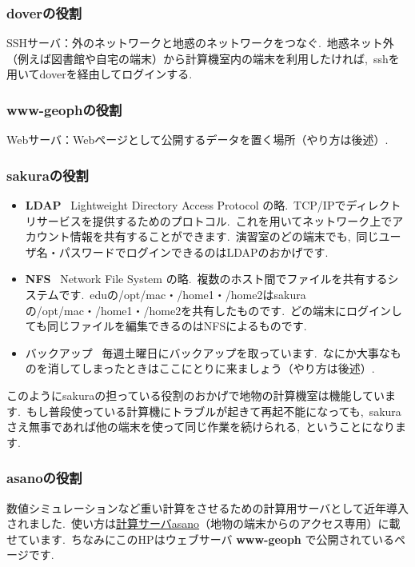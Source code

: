 \documentclass{jarticle}
\begin{document}
\subsubsection{doverの役割}
SSHサーバ：外のネットワークと地惑のネットワークをつなぐ.\ 地惑ネット外（例えば図書館や自宅の端末）から計算機室内の端末を利用したければ,\ sshを用いてdoverを経由してログインする.\ 

\subsubsection{www-geophの役割}
Webサーバ：Webページとして公開するデータを置く場所（やり方は後述）.\ 

\subsubsection{sakuraの役割}
\begin{itemize}
\item {\bf LDAP} \ 
Lightweight Directory Access Protocol の略.\ TCP/IPでディレクトリサービスを提供するためのプロトコル.\ これを用いてネットワーク上でアカウント情報を共有することができます.\ 演習室のどの端末でも,\ 同じユーザ名・パスワードでログインできるのはLDAPのおかげです.\ 

\item {\bf NFS} \ 
Network File System の略.\ 複数のホスト間でファイルを共有するシステムです.\ eduの/opt/mac・/home1・/home2はsakuraの/opt/mac・/home1・/home2を共有したものです.\ どの端末にログインしても同じファイルを編集できるのはNFSによるものです.\ 

\item バックアップ \ 
毎週土曜日にバックアップを取っています.\ なにか大事なものを消してしまったときはここにとりに来ましょう（やり方は後述）.\ 
\end{itemize}

このようにsakuraの担っている役割のおかげで地物の計算機室は機能しています.\ もし普段使っている計算機にトラブルが起きて再起不能になっても,\ sakuraさえ無事であれば他の端末を使って同じ作業を続けられる,\ ということになります.\ 

\subsubsection{asanoの役割}
数値シミュレーションなど重い計算をさせるための計算用サーバとして近年導入されました.\ 
使い方は\href{http://www-geoph.eps.s.u-tokyo.ac.jp/~s162633/epp_computers/index.php?asano}{計算サーバasano}（地物の端末からのアクセス専用）に載せています.\ ちなみにこのHPはウェブサーバ {\bf www-geoph} で公開されているページです.\ 
\end{document}
